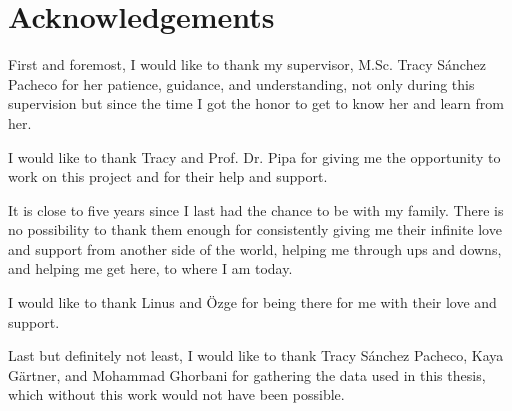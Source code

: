 \chapter*{Acknowledgements}\label{cha:acknowledgement}


First and foremost, I would like to thank my supervisor, M.Sc. Tracy Sánchez Pacheco for her patience, guidance, and understanding, not only during this supervision but since the time I got the honor to get to know her and learn from her.

I would like to thank Tracy and Prof. Dr. Pipa for giving me the opportunity to work on this project and for their help and support.

It is close to five years since I last had the chance to be with my family. There is no possibility to thank them enough for consistently giving me their infinite love and support from another side of the world, helping me through ups and downs, and helping me get here, to where I am today.

I would like to thank Linus and Özge for being there for me with their love and support.

Last but definitely not least, I would like to thank Tracy Sánchez Pacheco, Kaya Gärtner, and Mohammad Ghorbani for gathering the data used in this thesis, which without this work would not have been possible.

\newpage
\shipout\null
